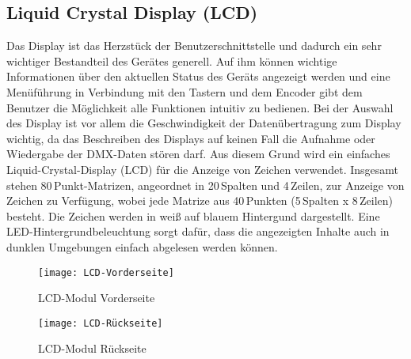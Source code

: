 
\subsection{Liquid Crystal Display (LCD)}
Das Display ist das Herzstück der Benutzerschnittstelle und dadurch ein sehr wichtiger Bestandteil des Gerätes generell. Auf ihm können wichtige Informationen über den aktuellen Status des Geräts angezeigt werden und eine Menüführung in Verbindung mit den Tastern und dem Encoder gibt dem Benutzer die Möglichkeit alle Funktionen intuitiv zu bedienen. Bei der Auswahl des Display ist vor allem die Geschwindigkeit der Datenübertragung zum Display wichtig, da das Beschreiben des Displays auf keinen Fall die Aufnahme oder Wiedergabe der DMX-Daten stören darf. Aus diesem Grund wird ein einfaches Liquid-Crystal-Display (LCD) für die Anzeige von Zeichen verwendet. Insgesamt stehen 80\,Punkt-Matrizen, angeordnet in 20\,Spalten und 4\,Zeilen, zur Anzeige von Zeichen zu Verfügung, wobei jede Matrize aus 40\,Punkten (5\,Spalten x 8\,Zeilen) besteht. Die Zeichen werden in weiß auf blauem Hintergund dargestellt. Eine LED-Hintergrundbeleuchtung sorgt dafür, dass die angezeigten Inhalte auch in dunklen Umgebungen einfach abgelesen werden können.
\begin{figure}[h]
	\begin{minipage}{.45\linewidth}
		\centering
		\texttt{[image: LCD-Vorderseite]}
		\caption{LCD-Modul Vorderseite}
		\label{fig:LCD-front}
	\end{minipage}
	\hfill
	\begin{minipage}{.45\linewidth}
		\centering
		\texttt{[image: LCD-Rückseite]}
		\caption{LCD-Modul Rückseite}
		\label{fig:LCD-back}
	\end{minipage}
\end{figure}
